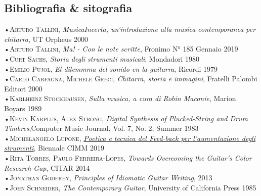 \documentclass[oneside]{article}
\begin{document}
\begin{multicols*}{2}
\section{ Bibliografia \& sitografia}
•\textsc{\textsf {Arturo Tallini}}, \emph{MusicaIncerta, un'introduzione alla musica contemporanea per chitarra}, UT Orpheus 2000\\\newline
•\textsc{\textsf {Arturo Tallini}}, \emph{Ma! - Con le note scritte}, Fronimo N° 185 Gennaio 2019\\\newline
•\textsc{\textsf {Curt Sachs}}, \emph{Storia degli strumenti musicali}, Mondadori 1980\\\newline
•\textsc{\textsf {Emilio Pujol}}, \emph{El dilemmma del sonido en la guitarra}, Ricordi 1979\\\newline
•\textsc{\textsf {Carlo Carfagna, Michele Greci}}, \emph{Chitarra, storia e immagini}, Fratelli Palombi Editori 2000\\\newline
•\textsc{\textsf {Karlheinz Stockhausen}}, \emph{Sulla musica, a cura di Robin Maconie}, Marion Boyars 1989\\\newline
•\textsc{\textsf {Kevin Karplus, Alex Strong}}, \emph{Digital Synthesis of Plucked-String and Drum Timbres},Computer Music Journal, Vol. 7, No. 2,
Summer 1983\\\newline
•\textsc{\textsf {Michelangelo Lupone}}, \emph{\href{https://www.youtube.com/watch?v=btioUhxSoCM}{Poetica e tecnica del Feed-back per l’aumentazione degli strumenti}}, Biennale CIMM 2019\\\newline
•\textsc{\textsf {Rita Torres, Paulo Ferreira-Lopes}}, \emph{Towards Overcoming the Guitar's Color Research Gap}, CITAR 2014\\\newline
•\textsc{\textsf {Jonathan Godfrey}}, \emph{Principles of Idiomatic Guitar Writing},  2013\\\newline
•\textsc{\textsf {John Schneider}}, \emph{The Contemporary Guitar},  University of California Press 1985\\\newline

\vfill\null
\columnbreak


\end{multicols*}
\end{document}
